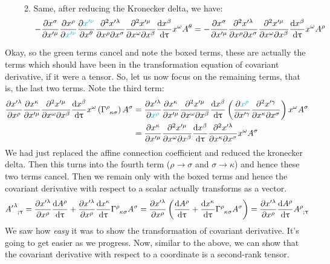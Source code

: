 \begin{itemize}
\begin{enumerate}
\begin{align*}
        \end{align*}
        \item Same, after reducing the Kronecker delta, we have: \begin{align*}
           - \pdv{x^\sigma}{x'^\mu} \pdv{x^\rho}{\mathcolor{cyan}{x'^\nu}} \pdv{\mathcolor{cyan}{x'^\nu}}{x^\theta} \pdv{x'^\lambda}{x^\rho}{x^\sigma}\pdv{x'^\mu}{x^\omega}{x^\beta} \dv{x^\beta}{\uptau} x^\omega  A^\theta = -\pdv{x^\sigma}{x'^\mu}  \pdv{x'^\lambda}{x^\rho}{x^\sigma}\pdv{x'^\mu}{x^\omega}{x^\beta} \dv{x^\beta}{\uptau} x^\omega  A^\rho
        \end{align*}
    \end{enumerate}
\end{itemize}
Okay, so the green terms cancel and note the boxed terms, these are actually the terms which should have been in the transformation equation of covariant derivative, if it were a tensor. So, let us now focus on the remaining terms, that is, the last two terms. Note the third term:
\begin{align*}
    \pdv{x'^\lambda}{x^\rho} \pdv{x^\kappa}{x'^\mu} \pdv{x'^\mu}{x^\omega}{x^\beta} \dv{x^\beta}{\uptau} x^\omega \brac{\tensor{\Gamma}{^\rho_\kappa _\sigma}} A^\sigma &= \pdv{x'^\lambda}{\mathcolor{cyan}{x^\rho}} \pdv{x^\kappa}{x'^\mu} \pdv{x'^\mu}{x^\omega}{x^\beta} \dv{x^\beta}{\uptau} \brac{\pdv{\mathcolor{cyan}{x^\rho}}{x'^\gamma}\pdv{x'^\gamma}{x^\kappa}{x^\sigma}}x^\omega A^\sigma \\
    &= \pdv{x^\kappa}{x'^\mu} \pdv{x'^\mu}{x^\omega}{x^\beta} \dv{x^\beta}{\uptau} \pdv{x'^\lambda}{x^\kappa}{x^\sigma}x^\omega A^\sigma
\end{align*}
We had just replaced the affine connection coefficient and reduced the kronecker delta. Then this turns into the fourth term ($\rho \rightarrow \sigma$ and $\sigma \rightarrow \kappa$) and hence these two terms cancel. Then we remain only with the boxed terms and hence the covariant derivative with respect to a scalar actually transforms as a vector. 
$$\tensor{{A'}}{^\lambda _{;\uptau}} = \pdv{x'^\lambda}{x^\rho} \dv{A^\rho}{\uptau} +\pdv{x'^\lambda}{x^\rho}\dv{x^\kappa}{\uptau}\tensor{\Gamma}{^\rho _\kappa _\sigma}A^\sigma =  \pdv{x'^\lambda}{x^\rho}\brac{\dv{A^\rho}{\uptau}+\dv{x^\kappa}{\uptau}\tensor{\Gamma}{^\rho _\kappa _\sigma}A^\sigma} = \pdv{x'^\lambda}{x^\rho} \dv{A^\rho}{\uptau}\tensor{A}{^\rho _; _\uptau}$$
We saw how \textit{easy} it was to show the transformation of covariant derivative. It's going to get easier as we progress. Now, similar to the above, we can show that the covariant derivative with respect to a coordinate is a second-rank tensor. 
